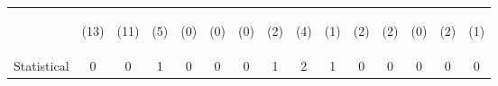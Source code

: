 \begin{tabular}{lcccccccccccccc}
 & \begin{footnotesize}(13)\end{footnotesize} & \begin{footnotesize}(11)\end{footnotesize} & \begin{footnotesize}(5)\end{footnotesize} & \begin{footnotesize}(0)\end{footnotesize} & \begin{footnotesize}(0)\end{footnotesize} & \begin{footnotesize}(0)\end{footnotesize} & \begin{footnotesize}(2)\end{footnotesize} & \begin{footnotesize}(4)\end{footnotesize} & \begin{footnotesize}(1)\end{footnotesize} & \begin{footnotesize}(2)\end{footnotesize} & \begin{footnotesize}(2)\end{footnotesize} & \begin{footnotesize}(0)\end{footnotesize} & \begin{footnotesize}(2)\end{footnotesize} & \begin{footnotesize}(1)\end{footnotesize}\\
\noalign{\smallskip}Statistical & 0 & 0 & 1 & 0 & 0 & 0 & 1 & 2 & 1 & 0 & 0 & 0 & 0 & 0\\

\end{tabular}
